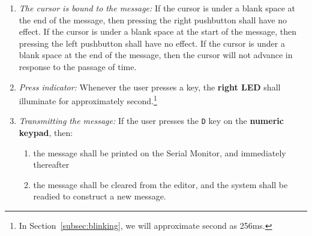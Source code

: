 \begin{enumerate}
\begin{enumerate}
        \end{enumerate}
    \item \textit{The cursor is bound to the message:} \label{spec:boundCursor} If the cursor is under a blank space at the end of the message, then pressing the right pushbutton shall have no effect.
        If the cursor is under a blank space at the start of the message, then pressing the left pushbutton shall have no effect.
        If the cursor is under a blank space at the end of the message, then the cursor will not advance in response to the passage of time.
    \item \textit{Press indicator:} \label{spec:pressIndicator} Whenever the user presses a key, the \textbf{right LED} shall illuminate for approximately \textonequarter second.\footnote{
            In Section~\ref{subsec:blinking}, we will approximate \textonequarter second as 256ms.
        }
    \item \textit{Transmitting the message:} \label{spec:transmission} If the user presses the \texttt{D} key on the \textbf{numeric keypad}, then:
        \begin{enumerate}
            \item the message shall be printed on the Serial Monitor, and immediately thereafter
            \item the message shall be cleared from the editor, and the system shall be readied to construct a new message.
        \end{enumerate}
\end{enumerate}